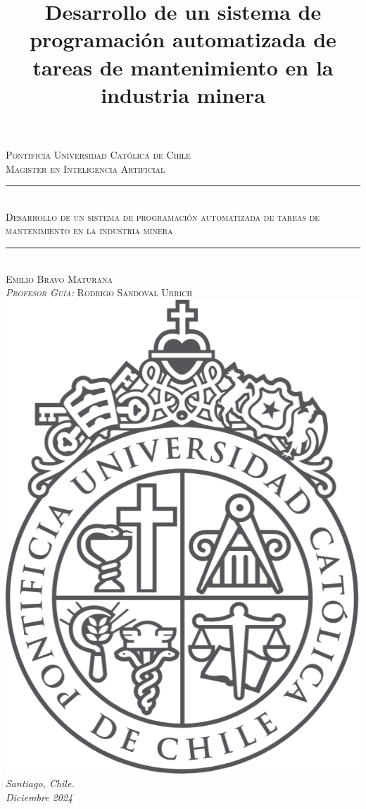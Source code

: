 \documentclass{article}
\title{Desarrollo de un sistema de programación automatizada de tareas de mantenimiento en la industria minera}
\date{}
\begin{document}
\begin{titlepage}
\newcommand{\HRule}{\rule{\linewidth}{0.5mm}}
\center
\textsc{\LARGE Pontificia Universidad Católica de Chile}\\[1cm] 
\textsc{\large Magister en Inteligencia Artificial}\\[0.5cm] 
\HRule \\[0.4cm]
\huge \textsc{Desarrollo de un sistema de programación automatizada de tareas de mantenimiento en la industria minera}\\[0.1cm]
\HRule \\[1cm]
\large\textsc{Emilio Bravo Maturana\\\emph{Profesor Guía: }Rodrigo Sandoval Urrich}\\[1cm]
\includegraphics[scale=0.2]{imgs/UC Logo Grande.png}\\[1cm]
\vfill
{\large\emph{Santiago, Chile. \\ Diciembre 2024 }}\\[2cm]


\end{titlepage}
\end{document}
